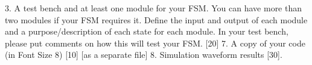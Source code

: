 \documentclass[11pt]{article}
\begin{document}
3. A test bench and at least one module for your FSM. You can have more than two
modules if your FSM requires it. Define the input and output of each module and
a purpose/description of each state for each module. In your test bench, please put
comments on how this will test your FSM. [20]
7. A copy of your code (in Font Size 8) [10] [as a separate file]
8. Simulation waveform results [30].
\end{document}
